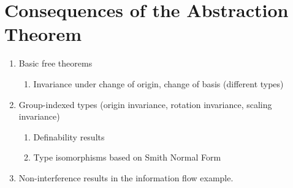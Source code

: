 \section{Consequences of the Abstraction Theorem}
\label{sec:instantiations}

\begin{enumerate}
\item Basic free theorems
  \begin{enumerate}
  \item Invariance under change of origin, change of basis (different
    types)
  \end{enumerate}
\item Group-indexed types (origin invariance, rotation invariance,
  scaling invariance)
  \begin{enumerate}
  \item Definability results
  \item Type isomorphisms based on Smith Normal Form
  \end{enumerate}
\item Non-interference results in the information flow example.
\end{enumerate}

